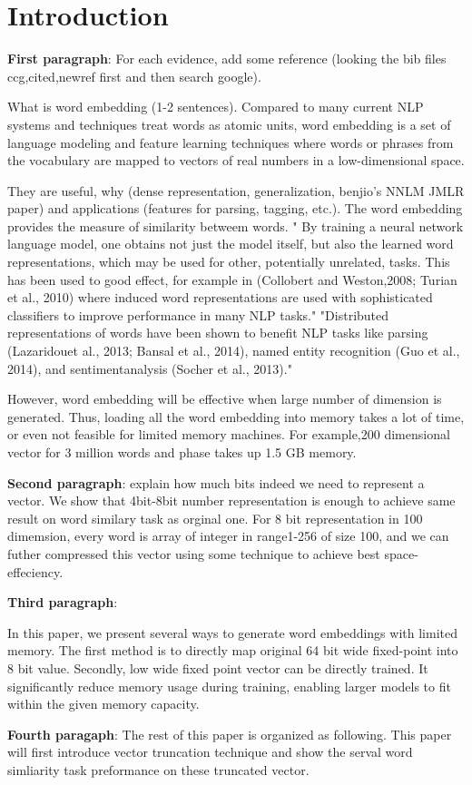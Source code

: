\section{Introduction}
\label{sec:intro}

{\bf First paragraph}: For each evidence, add some reference (looking the bib files ccg,cited,newref first and then search google).

What is word embedding (1-2 sentences).  Compared to many current NLP systems and techniques treat words as atomic units, word embedding is  a set of language modeling and feature learning techniques where words or phrases from the vocabulary are mapped to vectors of real numbers in a low-dimensional space.

They are useful, why (dense representation, generalization, benjio's NNLM JMLR paper) and applications (features for parsing, tagging, etc.). The word embedding provides the measure of similarity betweem words. " By training a neural network language model, one obtains not just the model itself, but also the learned word representations, which may be used for other,
potentially unrelated, tasks. This has been used to good effect, for example in (Collobert and Weston,2008; Turian et al., 2010) where induced word representations are used with sophisticated classifiers to improve performance in many NLP tasks." "Distributed representations of words have been shown to benefit NLP tasks like parsing (Lazaridouet al., 2013; Bansal et al., 2014), named entity recognition (Guo et al., 2014), and sentimentanalysis (Socher et al., 2013)."


However, word embedding will be effective when large number of dimension is generated. Thus, loading all the word embedding into memory takes a lot of time, or even not feasible for limited memory machines. For example,200 dimensional vector for 3 million words and phase takes up 1.5 GB memory.

{\bf Second paragraph}: explain how much bits indeed we need to represent a vector. We show that 4bit-8bit number representation is enough to achieve same result on word similary task as orginal one. For 8 bit representation in 100 dimemsion, every word is array of integer in range1-256 of size 100, and we can futher compressed this vector using some technique to achieve best space-effeciency. 


{\bf Third paragraph}:

In this paper, we present several ways to generate word embeddings with limited memory. The first method is to directly map original 64 bit wide fixed-point into 8 bit value. Secondly, low wide fixed point vector can be directly trained. It significantly reduce memory usage during training, enabling larger models to fit within the given memory capacity.



{\bf Fourth paragaph}: The rest of this paper is organized as following. This paper will first introduce vector truncation technique and show the serval word simliarity task preformance on these truncated vector.


